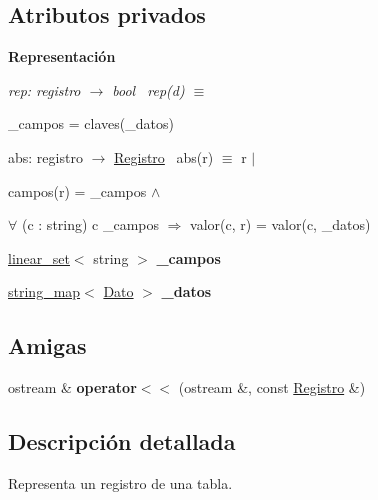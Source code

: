 \subsection*{Atributos privados}
\begin{Indent}\textbf{ Representación}\par
{\em rep\+: registro $\to$ bool~\newline
rep(d) $\equiv$
\begin{DoxyItemize}
\item \+\_\+campos = claves(\+\_\+datos)
\end{DoxyItemize}

abs\+: registro $\to$ \mbox{\hyperlink{classRegistro}{Registro}}~\newline
abs(r) $\equiv$ r\textquotesingle{} $|$
\begin{DoxyItemize}
\item campos(r\textquotesingle{}) = \+\_\+campos $\land$
\item $\forall$ (c \+: string) c  \+\_\+campos $\Rightarrow$ valor(c, r\textquotesingle{}) = valor(c, \+\_\+datos) 
\end{DoxyItemize}}\begin{DoxyCompactItemize}
\item 
\mbox{\label{classRegistro_ad6c12d81cb20086a4642f4b85fe8063b}} 
\mbox{\hyperlink{classlinear__set}{linear\+\_\+set}}$<$ string $>$ {\bfseries \+\_\+campos}
\item 
\mbox{\label{classRegistro_aa23f2dcc0afcca1c5c00b5272f4c1b20}} 
\mbox{\hyperlink{classstring__map}{string\+\_\+map}}$<$ \mbox{\hyperlink{classDato}{Dato}} $>$ {\bfseries \+\_\+datos}
\end{DoxyCompactItemize}
\end{Indent}
\subsection*{Amigas}
\begin{DoxyCompactItemize}
\item 
\mbox{\label{classRegistro_a66788288d92ef16b5a3aab86ae6d87fc}} 
ostream \& {\bfseries operator$<$$<$} (ostream \&, const \mbox{\hyperlink{classRegistro}{Registro}} \&)
\end{DoxyCompactItemize}


\subsection{Descripción detallada}
Representa un registro de una tabla. 

